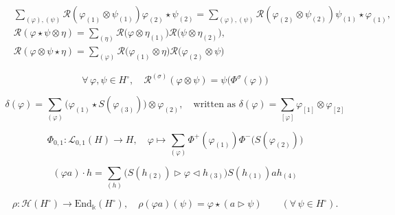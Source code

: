 \documentclass[10pt,a4paper]{amsart}
\begin{document}
\begin{align}
&\sum_{(\varphi),(\psi)}\mathcal{R}(\varphi_{(1)} \otimes \psi_{(1)})\varphi_{(2)} \star \psi_{(2)} = \sum_{(\varphi),(\psi)}\mathcal{R}(\varphi_{(2)} \otimes \psi_{(2)})\psi_{(1)}\star \varphi_{(1)}, \label{braidedComm}\\
&\mathcal{R}(\varphi \star \psi \otimes \eta) = \sum_{(\eta)} \mathcal{R}\bigl(\varphi \otimes \eta_{(1)}\bigr)\mathcal{R}\bigl(\psi \otimes \eta_{(2)}\bigr),\label{coTriang1}\\
&\mathcal{R}(\varphi \otimes \psi \star \eta) = \sum_{(\varphi)} \mathcal{R}\bigl(\varphi_{(1)} \otimes \eta\bigr)\mathcal{R}\bigl(\varphi_{(2)} \otimes \psi\bigr)\label{coTriang2}
\end{align}

\begin{equation}\label{coRMatSign}
\forall \, \varphi, \psi \in H^\circ, \quad \mathcal{R}^{(\sigma)}(\varphi \otimes \psi) = \psi\bigl( \Phi^{\sigma}(\varphi) \bigr)
\end{equation}

 \begin{equation}\label{defCoactCoad}
\delta(\varphi) = \sum_{(\varphi)} \bigl( \varphi_{(1)} \star S(\varphi_{(3)}) \bigr) \otimes \varphi_{(2)}, \quad \text{written as } \delta(\varphi) = \sum_{[\varphi]} \varphi_{[1]} \otimes \varphi_{[2]}
\end{equation}

\begin{equation}\label{RSDphi}
\Phi_{0,1} : \mathcal{L}_{0,1}(H) \to H, \quad \varphi \mapsto \sum_{(\varphi)} \Phi^+(\varphi_{(1)})\Phi^-\bigl( S(\varphi_{(2)}) \bigr)
\end{equation}

\begin{equation}\label{modAlgStructHeisenberg}
(\varphi a) \cdot h = \sum_{(h)} \bigl( S(h_{(2)}) \rhd \varphi \lhd h_{(3)} \bigr) S(h_{(1)})ah_{(4)}
\end{equation}

\begin{equation}\label{HeisenbergRep}
\rho : \mathcal{H}(H^\circ) \to \mathrm{End}_\Bbbk(H^\circ), \quad \rho(\varphi a)(\psi) = \varphi \star (a \rhd \psi) \qquad (\forall \, \psi \in H^\circ).
\end{equation}
\end{document}
